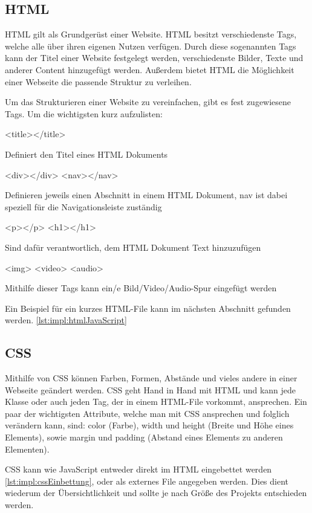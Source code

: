 \subsection{HTML}
HTML gilt als Grundgerüst einer Website. HTML besitzt verschiedenste Tags, welche alle über ihren eigenen Nutzen verfügen. Durch diese sogenannten Tags kann der Titel einer Website festgelegt werden, verschiedenste Bilder, Texte und anderer Content hinzugefügt werden. Außerdem bietet HTML die Möglichkeit einer Webseite die passende Struktur zu verleihen.
 
Um das Strukturieren einer Website zu vereinfachen, gibt es fest zugewiesene Tags. Um die wichtigsten kurz aufzulisten:
 
\begin{compactitem}
    \item [<title></title>]
    \item Definiert den Titel eines HTML Dokuments
    \item [<div></div> <nav></nav>]
    \item Definieren jeweils einen Abschnitt in einem HTML Dokument, nav ist dabei speziell für die Navigationsleiste zuständig
    \item [<p></p> <h1></h1>]
    \item Sind dafür verantwortlich, dem HTML Dokument Text hinzuzufügen
    \item [<img> <video> <audio>]
    \item Mithilfe dieser Tags kann ein/e Bild/Video/Audio-Spur eingefügt werden
\end{compactitem}
 
Ein Beispiel für ein kurzes HTML-File kann im nächsten Abschnitt gefunden werden. \ref{lst:impl:htmlJavaScript}
 
\subsection{CSS}
Mithilfe von CSS können Farben, Formen, Abstände und vieles andere in einer Webseite geändert werden. CSS geht Hand in Hand mit HTML und kann jede Klasse oder auch jeden Tag, der in einem HTML-File vorkommt, ansprechen. Ein paar der wichtigsten Attribute, welche man mit CSS ansprechen und folglich verändern kann, sind: color (Farbe), width und height (Breite und Höhe eines Elements), sowie margin und padding (Abstand eines Elements zu anderen Elementen).
 
CSS kann wie JavaScript entweder direkt im HTML eingebettet werden \ref{lst:impl:cssEinbettung}, oder als externes File angegeben werden. Dies dient wiederum der Übersichtlichkeit und sollte je nach Größe des Projekts entschieden werden.
 
